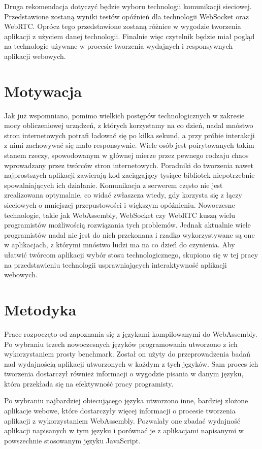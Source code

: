 \documentclass[language=polish,type=master]{aghmodern}
\begin{document}
Druga rekomendacja dotyczyć będzie wyboru technologii komunikacji sieciowej.
Przedstawione zostaną wyniki testów opóźnień dla technologii WebSocket oraz WebRTC.
Oprócz tego przedstawione zostaną różnice w wygodzie tworzenia aplikacji z użyciem danej technologii.
Finalnie więc czytelnik będzie miał pogląd na technologie używane w procesie tworzenia wydajnych i responsywnych aplikacji webowych.

\section{Motywacja}
Jak już wspomniano, pomimo wielkich postępów technologicznych w zakresie mocy obliczeniowej urządzeń, z których korzystamy na co dzień, nadal mnóstwo stron internetowych potrafi ładować się po kilka sekund, a przy próbie interakcji z nimi zachowywać się mało responsywnie.
Wiele osób jest poirytowanych takim stanem rzeczy, spowodowanym w głównej mierze przez pewnego rodzaju chaos wprowadzany przez twórców stron internetowych.
Poradniki do tworzenia nawet najprostszych aplikacji zawierają kod zaciągający tysiące bibliotek niepotrzebnie spowalniających ich działanie.
Komunikacja z serwerem często nie jest zrealizowana optymalnie, co widać zwłaszcza wtedy, gdy korzysta się z łączy sieciowych o mniejszej przepustowości i większym opóźnieniu.
Nowoczesne technologie, takie jak WebAssembly, WebSocket czy WebRTC kuszą wielu programistów możliwością rozwiązania tych problemów.
Jednak aktualnie wiele programistów nadal nie jest do nich przekonana i rzadko wykorzystywane są one w aplikacjach, z którymi mnóstwo ludzi ma na co dzień do czynienia.
Aby ułatwić twórcom aplikacji wybór stosu technologicznego, skupiono się w tej pracy na przedstawieniu technologii usprawniających interaktywność aplikacji webowych.

\section{Metodyka}
Prace rozpoczęto od zapoznania się z językami kompilowanymi do WebAssembly.
Po wybraniu trzech nowoczesnych języków programowania utworzono z ich wykorzystaniem prosty benchmark.
Został on użyty do przeprowadzenia badań nad wydajnością aplikacji utworzonych w każdym z tych języków.
Sam proces ich tworzenia dostarczył również informacji o wygodzie pisania w danym języku, która przekłada się na efektywność pracy programisty.

Po wybraniu najbardziej obiecującego języka utworzono inne, bardziej złożone aplikacje webowe, które dostarczyły więcej informacji o procesie tworzenia aplikacji z wykorzystaniem WebAssembly.
Pozwalały one zbadać wydajność aplikacji napisanych w tym języku i porównać je z aplikacjami napisanymi w powszechnie stosowanym języku JavaScript.
\end{document}

